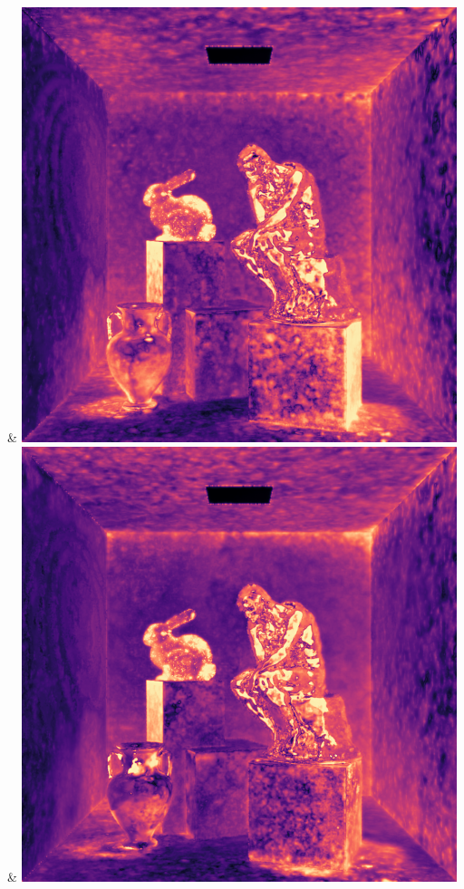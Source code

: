 & \includegraphics[width=\linewidth]{figures/py/tests/batch_size/100+nrc+pt+16_1spp_flip.png}
& \includegraphics[width=\linewidth]{figures/py/tests/batch_size/500+nrc+pt+16_1spp_flip.png}
